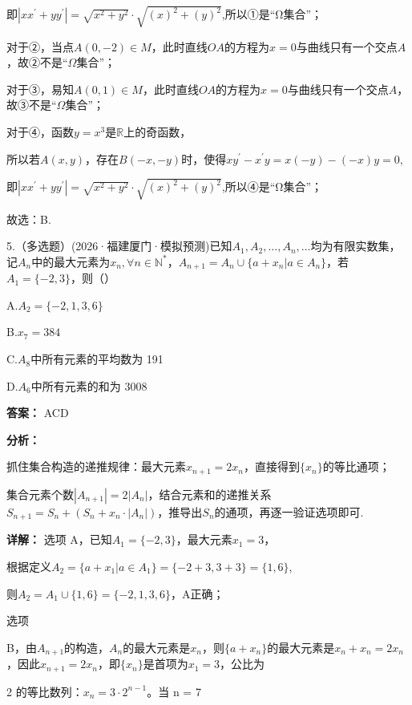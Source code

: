 \documentclass[11pt,a4paper]{ctexart}
\begin{document}
即\(\left| {xx}^{\prime } + {yy}^{\prime }\right|  = \sqrt{{x}^{2} + {y}^{2}} \cdot  \sqrt{{\left( x\right) }^{2} + {\left( y\right) }^{2}}\),所以①是``Ω集合''；

对于②，当点\(A(0, -2) \in M\)，此时直线\(OA\)的方程为\(x = 0\)与曲线只有一个交点\(A\)，故②不是``\(\Omega\)集合''；

对于③，易知\(A(0,1) \in M\)，此时直线\(OA\)的方程为\(x = 0\)与曲线只有一个交点\(A\)，故③不是``\(\Omega\)集合''；

对于④，函数\(y = x^3\)是\(\mathbb{R}\)上的奇函数，

所以若\(A(x,y)\)，存在\(B(-x, - y)\)时，使得\(xy^{\prime} - x^{\prime}y = x(-y) - (-x)y = 0,\)

即\(\left| {xx}^{\prime } + {yy}^{\prime }\right|  = \sqrt{{x}^{2} + {y}^{2}} \cdot  \sqrt{{\left( x\right) }^{2} + {\left( y\right) }^{2}}\),所以④是``Ω集合''；

故选：B.

5.（多选题）(2026·福建厦门·模拟预测)已知\(A_{1}, A_{2}, \ldots, A_{n}, \ldots\)均为有限实数集，记\(A_{n}\)中的最大元素为\(x_{n}, \forall n \in \mathbb{N}^{*}\)，\(A_{n+1} = A_{n} \cup \{a + x_{n} | a \in A_{n}\}\)，若\(A_{1} = \{-2, 3\}\)，则（）

A.\(A_{2} = \{-2,1,3,6\}\)

B.\(x_{7} = 384\)

C.\(A_{8}\)中所有元素的平均数为 191

D.\(A_{6}\)中所有元素的和为 3008

\textbf{答案：}
ACD

\textbf{分析：}

抓住集合构造的递推规律：最大元素\(x_{n+1}=2x_{n}\)，直接得到\(\{x_{n}\}\)的等比通项；

集合元素个数\(|A_{n+1}|=2|A_{n}|\)，结合元素和的递推关系\(S_{n+1}=S_{n}+(S_{n}+x_{n}\cdot|A_{n}|)\)，推导出\(S_{n}\)的通项，再逐一验证选项即可.

\textbf{详解：}
选项 A，已知\(A_{1}=\{-2,3\}\)，最大元素\(x_{1}=3\)，

根据定义\(A_{2}=\{a+x_{1}|a\in A_{1}\}=\{-2+3,3+3\}=\{1,6\}\),

则\(A_{2}=A_{1}\cup\{1,6\}=\{-2,1,3,6\}\)，A正确；

选项

B，由\(A_{n+1}\)的构造，\(A_{n}\)的最大元素是\(x_{n}\)，则\(\{a + x_{n}\}\)的最大元素是\(x_{n} + x_{n} = 2x_{n}\)，因此\(x_{n+1} = 2x_{n}\)，即\(\{x_{n}\}\)是首项为\(x_{1} = 3\)，公比为

2 的等比数列：\(x_{n} = 3 \cdot 2^{n-1}\)。当 n = 7
\end{document}
